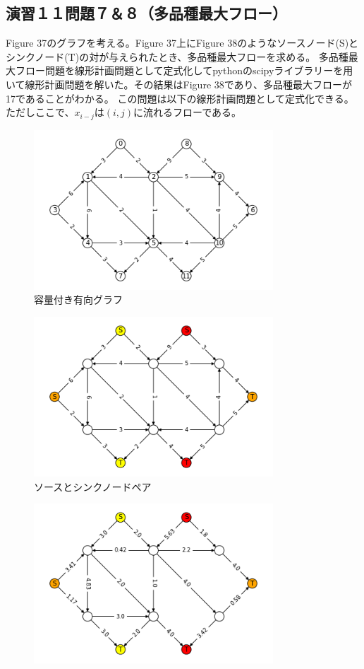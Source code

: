 \documentclass{report}
\begin{document}
\begin{CJK}{UTF8}{min}
    \section*{演習１１問題７＆８（多品種最大フロー）}
    Figure 37のグラフを考える。Figure 37上にFigure 38のようなソースノード(S)とシンクノード(T)の対が与えられたとき、多品種最大フローを求める。
    多品種最大フロー問題を線形計画問題として定式化してpythonのscipyライブラリーを用いて線形計画問題を解いた。その結果はFigure 38であり、多品種最大フローが17であることがわかる。
    この問題は以下の線形計画問題として定式化できる。ただしここで、$x_{i-j}$は$(i,j)$に流れるフローである。
    \begin{figure}[!h]
        \centerline{\includegraphics[width=0.8\textwidth]{data/ex12-MC-base.png}}
        \caption{容量付き有向グラフ}
    \end{figure}
    \begin{figure}[!h]
        \centerline{\includegraphics[width=0.8\textwidth]{data/ex12-MC-start.png}}
        \caption{ソースとシンクノードペア}
    \end{figure}
    \begin{figure}[!h]
        \centerline{\includegraphics[width=0.8\textwidth]{data/ex12-MC-result.png}}

\end{figure}
\end{CJK}
\end{document}
